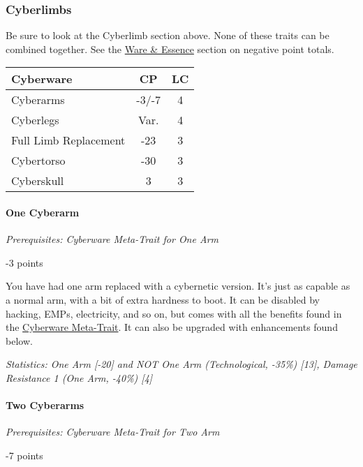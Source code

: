 \begin{multicols*}{3}
	\subsubsection{Cyberlimbs}
	
	Be sure to look at the Cyberlimb section above. None of these traits can be combined together. See the \hyperref[ware]{Ware \& Essence} section on negative point totals.
	
	\begin{center}
		\begin{tabularx}{0.32\textwidth}{|X|c|c|}
			\hline
			Cyberware & CP & LC\\
			\hline
			\hline
			Cyberarms & -3/-7 & 4 \\
			Cyberlegs & Var. & 4 \\
			Full Limb Replacement & -23 & 3 \\
			Cybertorso & -30 & 3 \\
			Cyberskull & 3 & 3 \\
			\hline
		\end{tabularx}
	\end{center}
	
	\paragraph{One Cyberarm}
	\textit{Prerequisites:  Cyberware Meta-Trait for One Arm}
	\begin{flushright}
		-3 points
	\end{flushright}
	
	You have had one arm replaced with a cybernetic version. It's just as capable as a normal arm, with a bit of extra hardness to boot. It can be disabled by hacking, EMPs, electricity, and so on, but comes with all the benefits found in the \hyperref[cyberware-meta-trait]{Cyberware Meta-Trait}. It can also be upgraded with enhancements found below.
	
	\textit{\textcolor{OliveGreen}{Statistics: One Arm [-20] and NOT One Arm (Technological, -35\%) [13], Damage Resistance 1 (One Arm, -40\%) [4]}}
	
	\paragraph{Two Cyberarms}
	\textit{Prerequisites:  Cyberware Meta-Trait for Two Arm}
	\begin{flushright}
		-7 points
	\end{flushright}
	

\end{multicols*}
